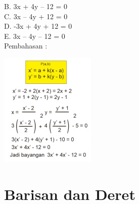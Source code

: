 \documentclass[11pt,fleqn]{book} %
\begin{document}
B. 3x + 4y – 12 = 0 \\

C. 3x – 4y + 12 = 0\\

D. -3x + 4y + 12 = 0\\

E. 3x – 4y – 12 = 0\\

Pembahasan :\\

\noindent
\begin{center}
\includegraphics{Pictures/32.jpg}\\
\end{center} 



\chapter{Barisan dan Deret}
\end{document}
